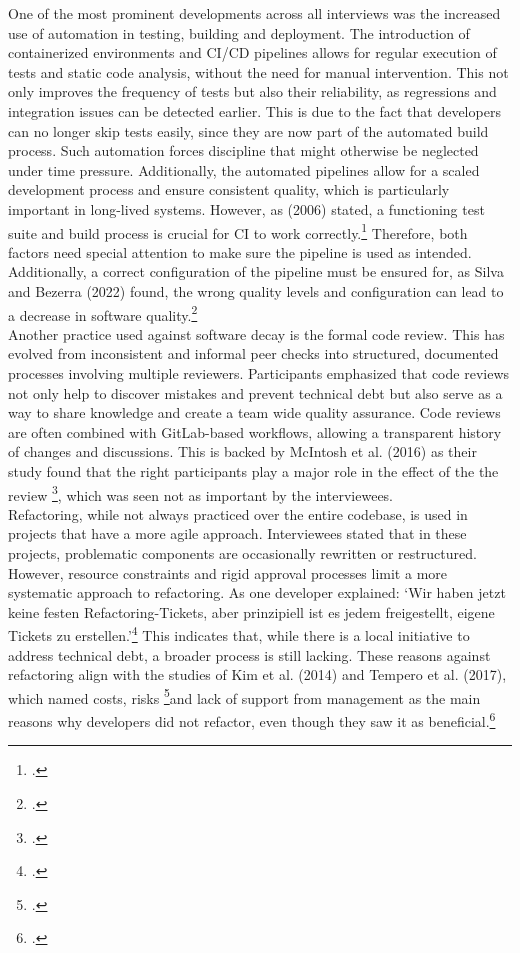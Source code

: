 One of the most prominent developments across all interviews was the increased use of automation in testing, building and deployment. The introduction of containerized environments and CI/CD pipelines allows for regular execution of tests and static code analysis, without the need for manual intervention.
This not only improves the frequency of tests but also their reliability, as regressions and integration issues can be detected earlier. This is due to the fact that developers can no longer skip tests easily, since they are now part of the automated build process.
Such automation forces discipline that might otherwise be neglected under time pressure. Additionally, the automated pipelines allow for a scaled development process and ensure consistent quality, which is particularly important in long-lived systems.
However, as  (2006) stated, a functioning test suite and build process is crucial for CI to work correctly.\footcite[]{fowlerContinuousIntegration2006} Therefore, both factors need special attention to make sure the pipeline is used as intended.
Additionally, a correct configuration of the pipeline must be ensured for, as Silva and Bezerra (2022) found, the wrong quality levels and configuration can lead to a decrease in software quality.\footcite[4]{silvaEmpiricalInvestigationInfluence2022}\\

Another practice used against software decay is the formal code review. This has evolved from inconsistent and informal peer checks into structured, documented processes involving multiple reviewers. Participants emphasized that code reviews not only help to discover mistakes and prevent technical debt but also
serve as a way to share knowledge and create a team wide quality assurance. Code reviews are often combined with GitLab-based workflows, allowing a transparent history of changes and discussions. This is backed by McIntosh et al. (2016) as their study found that the right participants play a major role in the effect of the the review \footcite[39]{mcintoshEmpiricalStudyImpact2016},
which was seen not as important by the interviewees.\\

Refactoring, while not always practiced over the entire codebase, is used in projects that have a more agile approach. Interviewees stated that in these projects, problematic components are occasionally rewritten or restructured. However, resource constraints and rigid approval processes limit a more systematic approach to refactoring.
As one developer explained: `Wir haben jetzt keine festen Refactoring-Tickets, aber prinzipiell ist es jedem freigestellt, eigene Tickets zu erstellen.'\footcite{Interview22025} This indicates that, while there is a local initiative to address technical debt, a broader process is still lacking.
These reasons against refactoring align with the studies of Kim et al. (2014) and Tempero et al. (2017), which named costs, risks \footcite[17]{kimEmpiricalStudyRefactoring2014}and lack of support from management as the main reasons why developers did not refactor, even though they saw it as beneficial.\footcite[60]{temperoBarriersRefactoring2017}\\

